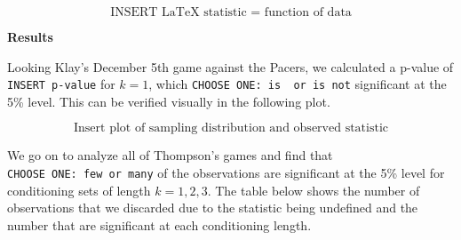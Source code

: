 \documentclass[11pt]{article}
\begin{document}
\[\text{INSERT LaTeX statistic = function of data}\]

\textbf{Results}

Looking Klay's December 5th game against the Pacers, we calculated a
p-value of \texttt{INSERT\ p-value} for \(k=1\), which
\texttt{CHOOSE\ ONE:\ is\ \ or\ is\ not} significant at the 5\% level.
This can be verified visually in the following plot.

\[\text{Insert plot of sampling distribution and observed statistic}\]

We go on to analyze all of Thompson's games and find that
\texttt{CHOOSE\ ONE:\ few\ or\ many} of the observations are significant
at the 5\% level for conditioning sets of length \(k=1,2,3\). The table
below shows the number of observations that we discarded due to the
statistic being undefined and the number that are significant at each
conditioning length.
\end{document}
